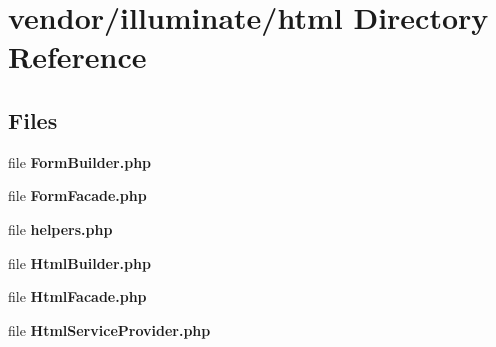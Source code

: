 \section{vendor/illuminate/html Directory Reference}
\label{dir_182d238d4879f61f6142afb68455eae8}
\subsection*{Files}
\begin{DoxyCompactItemize}
\item 
file {\bf Form\+Builder.\+php}
\item 
file {\bf Form\+Facade.\+php}
\item 
file {\bf helpers.\+php}
\item 
file {\bf Html\+Builder.\+php}
\item 
file {\bf Html\+Facade.\+php}
\item 
file {\bf Html\+Service\+Provider.\+php}
\end{DoxyCompactItemize}
